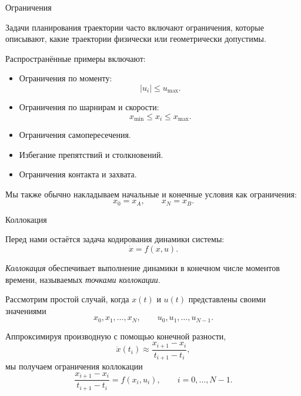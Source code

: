 \documentclass{beamer}
\begin{document}
	
	\begin{frame}{Ограничения}
		\begin{flushleft}
			Задачи планирования траектории часто включают ограничения,
			которые описывают, какие траектории физически или
			геометрически допустимы.
			
			\vspace{0.5em}
			
			Распространённые примеры включают:
			\begin{itemize}
				\item Ограничения по моменту:
				\[
				|u_i|\leq u_{\max}.
				\]
				
				\item Ограничения по шарнирам и скорости:
				\[
				x_{\min}\leq x_i\leq x_{\max}.
				\]
				
				\item Ограничения самопересечения.
				
				\item Избегание препятствий и столкновений.
				
				\item Ограничения контакта и захвата.
			\end{itemize}
			
			\vspace{0.5em}
			
			Мы также обычно накладываем начальные и конечные условия
			как ограничения:
			\[
			x_0=x_A,
			\qquad
			x_N=x_B.
			\]
		\end{flushleft}
	\end{frame}
	
	\begin{frame}{Коллокация}
		\begin{flushleft}
			Перед нами остаётся задача кодирования динамики системы:
			\[
			\dot{x}=f(x,u).
			\]
			
			\vspace{0.5em}
			
			\emph{Коллокация} обеспечивает выполнение динамики в конечном
			числе моментов времени, называемых \emph{точками коллокации}.
			
			\vspace{0.5em}
			
			Рассмотрим простой случай, когда $x(t)$ и $u(t)$
			представлены своими значениями
			\[
			x_0,x_1,\ldots,x_N,
			\qquad
			u_0,u_1,\ldots,u_{N-1}.
			\]
			
			Аппроксимируя производную с помощью конечной разности,
			\[
			\dot{x}(t_i)
			\approx
			\frac{x_{i+1}-x_i}{t_{i+1}-t_i},
			\]
			мы получаем ограничения коллокации
			\[
			\frac{x_{i+1}-x_i}{t_{i+1}-t_i}
			=
			f(x_i,u_i),
			\qquad
			i=0,\ldots,N-1.
			\]
		\end{flushleft}
	\end{frame}
	
\end{document}
